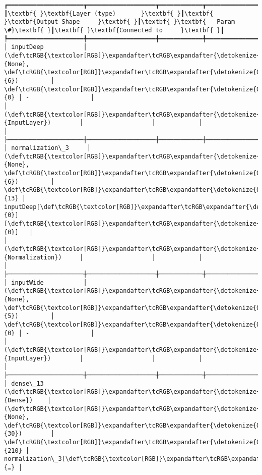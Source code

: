 \documentclass[12pt letter]{report}
\begin{document}
    \begin{Verbatim}[commandchars=\\\{\}]
┏━━━━━━━━━━━━━━━━━━━━━┳━━━━━━━━━━━━━━━━━━━┳━━━━━━━━━━━━┳━━━━━━━━━━━━━━━━━━━┓
┃\textbf{ }\textbf{Layer (type)       }\textbf{ }┃\textbf{ }\textbf{Output Shape     }\textbf{ }┃\textbf{ }\textbf{   Param \#}\textbf{ }┃\textbf{ }\textbf{Connected to     }\textbf{ }┃
┡━━━━━━━━━━━━━━━━━━━━━╇━━━━━━━━━━━━━━━━━━━╇━━━━━━━━━━━━╇━━━━━━━━━━━━━━━━━━━┩
│ inputDeep           │ (\def\tcRGB{\textcolor[RGB]}\expandafter\tcRGB\expandafter{\detokenize{0,215,255}}{None}, \def\tcRGB{\textcolor[RGB]}\expandafter\tcRGB\expandafter{\detokenize{0,175,0}}{6})         │          \def\tcRGB{\textcolor[RGB]}\expandafter\tcRGB\expandafter{\detokenize{0,175,0}}{0} │ -                 │
│ (\def\tcRGB{\textcolor[RGB]}\expandafter\tcRGB\expandafter{\detokenize{0,135,255}}{InputLayer})        │                   │            │                   │
├─────────────────────┼───────────────────┼────────────┼───────────────────┤
│ normalization\_3     │ (\def\tcRGB{\textcolor[RGB]}\expandafter\tcRGB\expandafter{\detokenize{0,215,255}}{None}, \def\tcRGB{\textcolor[RGB]}\expandafter\tcRGB\expandafter{\detokenize{0,175,0}}{6})         │         \def\tcRGB{\textcolor[RGB]}\expandafter\tcRGB\expandafter{\detokenize{0,175,0}}{13} │ inputDeep[\def\tcRGB{\textcolor[RGB]}\expandafter\tcRGB\expandafter{\detokenize{0,175,0}}{0}][\def\tcRGB{\textcolor[RGB]}\expandafter\tcRGB\expandafter{\detokenize{0,175,0}}{0}]   │
│ (\def\tcRGB{\textcolor[RGB]}\expandafter\tcRGB\expandafter{\detokenize{0,135,255}}{Normalization})     │                   │            │                   │
├─────────────────────┼───────────────────┼────────────┼───────────────────┤
│ inputWide           │ (\def\tcRGB{\textcolor[RGB]}\expandafter\tcRGB\expandafter{\detokenize{0,215,255}}{None}, \def\tcRGB{\textcolor[RGB]}\expandafter\tcRGB\expandafter{\detokenize{0,175,0}}{5})         │          \def\tcRGB{\textcolor[RGB]}\expandafter\tcRGB\expandafter{\detokenize{0,175,0}}{0} │ -                 │
│ (\def\tcRGB{\textcolor[RGB]}\expandafter\tcRGB\expandafter{\detokenize{0,135,255}}{InputLayer})        │                   │            │                   │
├─────────────────────┼───────────────────┼────────────┼───────────────────┤
│ dense\_13 (\def\tcRGB{\textcolor[RGB]}\expandafter\tcRGB\expandafter{\detokenize{0,135,255}}{Dense})    │ (\def\tcRGB{\textcolor[RGB]}\expandafter\tcRGB\expandafter{\detokenize{0,215,255}}{None}, \def\tcRGB{\textcolor[RGB]}\expandafter\tcRGB\expandafter{\detokenize{0,175,0}}{30})        │        \def\tcRGB{\textcolor[RGB]}\expandafter\tcRGB\expandafter{\detokenize{0,175,0}}{210} │ normalization\_3[\def\tcRGB{\textcolor[RGB]}\expandafter\tcRGB\expandafter{\detokenize{0,175,0}}{…} │

\end{Verbatim}
\end{document}
